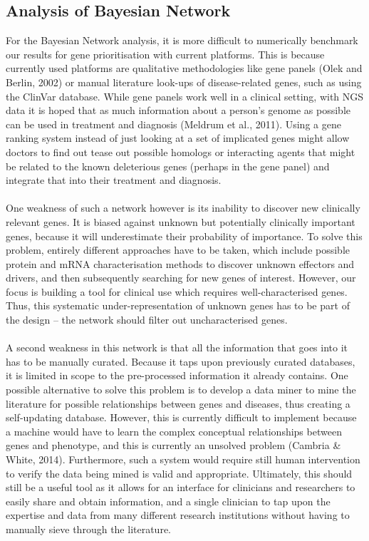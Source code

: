 \documentclass{article}
\begin{document}
\subsection{Analysis of Bayesian Network}
For the Bayesian Network analysis, it is more difficult to numerically benchmark our results for gene prioritisation with current platforms. This is because currently used platforms are qualitative methodologies like gene panels (Olek and Berlin, 2002) or manual literature look-ups of disease-related genes, such as using the ClinVar database. While gene panels work well in a clinical setting, with NGS data it is hoped that as much information about a person's genome as possible can be used in treatment and diagnosis (Meldrum et al., 2011). Using a gene ranking system instead of just looking at a set of implicated genes might allow doctors to find out tease out possible homologs or interacting agents that might be related to the known deleterious genes (perhaps in the gene panel) and integrate that into their treatment and diagnosis.\\\\ One weakness of such a network however is its inability to discover new clinically relevant genes. It is biased against unknown but potentially clinically important genes, because it will underestimate their probability of importance. To solve this problem, entirely different approaches have to be taken, which include possible protein and mRNA characterisation methods to discover unknown effectors and drivers, and then subsequently searching for new genes of interest. However, our focus is building a tool for clinical use which requires well-characterised genes. Thus, this systematic under-representation of unknown genes has to be part of the design -- the network should filter out uncharacterised genes. \\\\ A second weakness in this network is that all the information that goes into it has to be manually curated. Because it taps upon previously curated databases, it is limited in scope to the pre-processed information it already contains. One possible alternative to solve this problem is to develop a data miner to mine the literature for possible relationships between genes and diseases, thus creating a self-updating database. However, this is currently difficult to implement because a machine would have to learn the complex conceptual relationships between genes and phenotype, and this is currently an unsolved problem (Cambria \& White, 2014). Furthermore, such a system would require still human intervention to verify the data being mined is valid and appropriate. Ultimately, this should still be a useful tool as it allows for an interface for clinicians and researchers to easily share and obtain information, and a single clinician to tap upon the expertise and data from many different research institutions without having to manually sieve through the literature.
\end{document}
